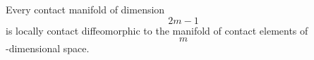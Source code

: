 Every contact manifold of dimension $$2m - 1$$ is locally contact diffeomorphic to the manifold of contact elements of $$m$$-dimensional space.
